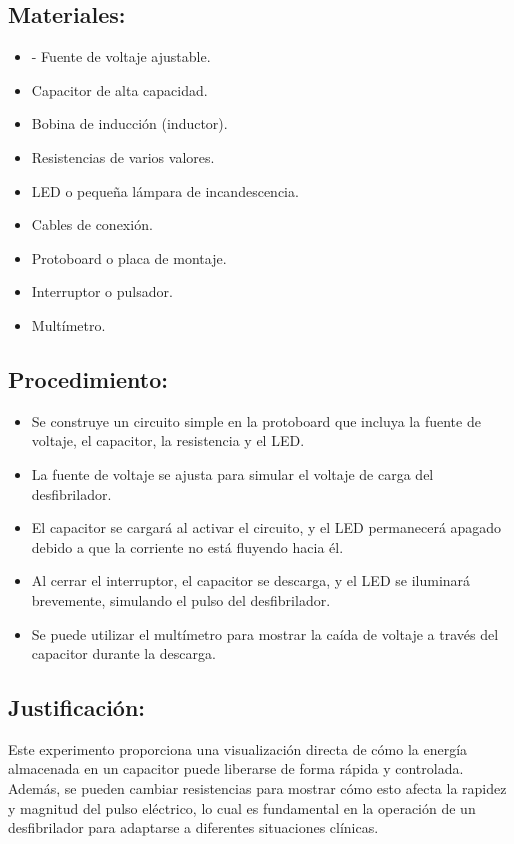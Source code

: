 \subsection{Materiales:}
\begin{itemize}
    \item - Fuente de voltaje ajustable.
    \item Capacitor de alta capacidad.
    \item Bobina de inducción (inductor).
    \item Resistencias de varios valores.
    \item LED o pequeña lámpara de incandescencia.
    \item Cables de conexión.
    \item Protoboard o placa de montaje.
    \item Interruptor o pulsador.
    \item Multímetro.
\end{itemize}

\subsection{Procedimiento:}
\begin{itemize}
    \item Se construye un circuito simple en la protoboard que incluya la fuente de voltaje, el capacitor, la resistencia y el LED.
    \item La fuente de voltaje se ajusta para simular el voltaje de carga del desfibrilador.
    \item El capacitor se cargará al activar el circuito, y el LED permanecerá apagado debido a que la corriente no está fluyendo hacia él.
    \item Al cerrar el interruptor, el capacitor se descarga, y el LED se iluminará brevemente, simulando el pulso del desfibrilador.
    \item Se puede utilizar el multímetro para mostrar la caída de voltaje a través del capacitor durante la descarga.
\end{itemize}

\subsection{Justificación:}
Este experimento proporciona una visualización directa de cómo la energía almacenada en un capacitor puede liberarse de forma rápida y controlada. Además, se pueden cambiar resistencias para mostrar cómo esto afecta la rapidez y magnitud del pulso eléctrico, lo cual es fundamental en la operación de un desfibrilador para adaptarse a diferentes situaciones clínicas.

